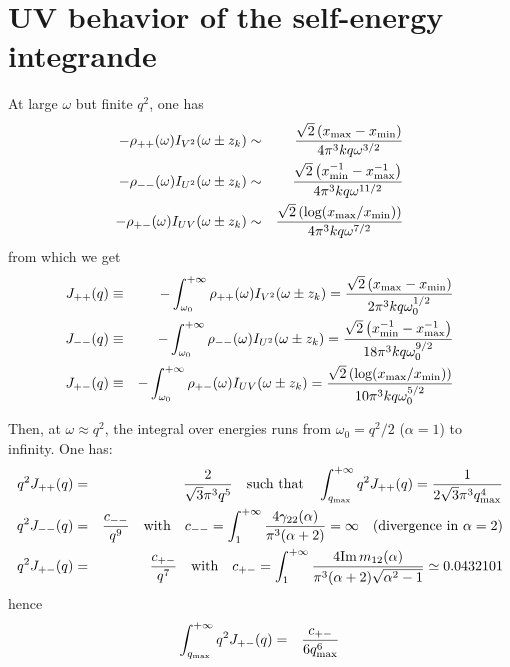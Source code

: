\documentclass[10pt,a4paper,a4wide]{article}
\newcommand{\bea}{\begin{eqnarray}}
\newcommand{\eea}{\end{eqnarray}}
\newcommand{\bb}[1]{\left( #1 \right)}
\begin{document}
\section{UV behavior of the self-energy integrande}
At large $\omega$ but finite $q^2$, one has
\bea
-\rho_{++}(\omega) I_{V^2}(\omega\pm z_k)&\sim&\frac{\sqrt{2}\bb{x_{\rm max}-x_{\rm min}}}{4\pi^3 kq\omega^{3/2}}\\
-\rho_{--}(\omega) I_{U^2}(\omega\pm z_k)&\sim&\frac{\sqrt{2}\bb{x_{\rm min}^{-1}-x_{\rm max}^{-1}}}{4\pi^3 kq\omega^{11/2}}\\
-\rho_{+-}(\omega) I_{UV}(\omega\pm z_k)&\sim&\frac{\sqrt{2}\bb{\text{log}(x_{\rm max}/x_{\rm min})}}{4\pi^3 kq\omega^{7/2}} 
\eea
from which we get
\bea
J_{++}(q)&\equiv&-\int_{\omega_{0}}^{+\infty}\rho_{++}(\omega) I_{V^2}(\omega\pm z_k)=\frac{\sqrt{2}\bb{x_{\rm max}-x_{\rm min}}}{2\pi^3 kq\omega_0^{1/2}} \\
J_{--}(q)&\equiv&-\int_{\omega_{0}}^{+\infty}\rho_{--}(\omega) I_{U^2}(\omega\pm z_k)=\frac{\sqrt{2}\bb{x_{\rm min}^{-1}-x_{\rm max}^{-1}}}{18\pi^3 kq\omega_0^{9/2}} \\
J_{+-}(q)&\equiv&-\int_{\omega_{0}}^{+\infty}\rho_{+-}(\omega) I_{UV}(\omega\pm z_k)=\frac{\sqrt{2}\bb{\text{log}(x_{\rm max}/x_{\rm min})}}{10\pi^3 kq\omega_0^{5/2}} 
\eea

Then, at $\omega\approx q^2$, the integral over energies runs from $\omega_0=q^2/2$ ($\alpha=1$) to infinity. One has:
\bea
q^2J_{++}(q)&=&\frac{2}{\sqrt{3}\pi^3q^5} \quad \text{such that} \quad \int_{q_{\rm max}}^{+\infty} q^2J_{++}(q)=\frac{1}{2\sqrt{3}\pi^3 q_{\rm max}^4} \\
q^2J_{--}(q)&=&\frac{c_{--}}{q^9} \quad \text{with} \quad c_{--}=\int_1^{+\infty} \frac{4\gamma_{22}(\alpha)}{\pi^3(\alpha+2)}=\infty \quad \text{(divergence in } \alpha=2 ) \\
q^2J_{+-}(q)&=&\frac{c_{+-}}{q^7} \quad \text{with} \quad c_{+-}=\int_1^{+\infty} \frac{4\text{Im}\, m_{12}(\alpha)}{\pi^3(\alpha+2)\sqrt{\alpha^2-1}} \simeq 0.0432101
\eea
hence
\bea
\int_{q_{\rm max}}^{+\infty}q^2J_{+-}(q)&=& \frac{c_{+-}}{6q_{\rm max}^6}
\eea


\end{document}
